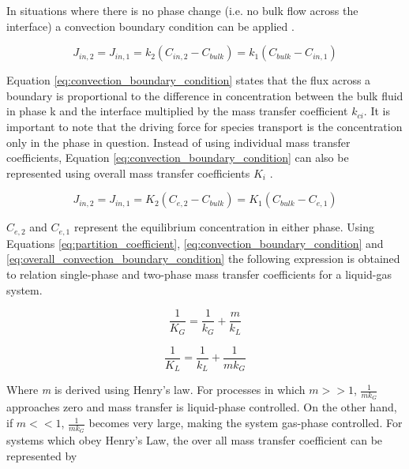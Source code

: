 In situations where there is no phase change (i.e. no bulk flow across the interface) a convection boundary condition can be applied \cite{deen2016}. 

 \begin{equation}
	J_{in,2} =J_{in,1} = k_{2}(C_{in,2} - C_{bulk}) = k_{1}(C_{bulk} - C_{in,1})
	\label{eq:convection_boundary_condition}
\end{equation}

Equation \ref{eq:convection_boundary_condition} states that the flux across a boundary is proportional to the difference in concentration between the bulk fluid in phase k and the interface multiplied by the mass transfer coefficient $k_{ci}$. It is important to note that the driving force for species transport is the concentration only in the phase in question. Instead of using individual mass transfer coefficients, Equation \ref{eq:convection_boundary_condition} can also be represented using overall mass transfer coefficients $K_{i}$ \cite{bird2006}.

 \begin{equation}
	J_{in,2} =J_{in,1} = K_{2}(C_{e,2} - C_{bulk}) = K_{1}(C_{bulk} - C_{e,1})
	\label{eq:overall_convection_boundary_condition}
\end{equation}

$C_{e,2}$ and $C_{e,1}$ represent the equilibrium concentration in either phase. Using Equations \ref{eq:partition_coefficient}, \ref{eq:convection_boundary_condition} and  \ref{eq:overall_convection_boundary_condition} the following expression is obtained to relation single-phase and two-phase mass transfer coefficients for a liquid-gas system.

\begin{equation}
	\frac{1}{K_{G}} = \frac{1}{k_{G}} + \frac{m}{k_{L}}
	\label{eq:gas_phase_resistance}
\end{equation}

\begin{equation}
	\frac{1}{K_{L}} = \frac{1}{k_{L}} + \frac{1}{mk_{G}}
	\label{eq:liq_phase_resistance}
\end{equation}

Where \textit{m} is derived using Henry's law. For processes in which $ m >> 1$, $ \frac{1}{mk_{G}} $ approaches zero and mass transfer is liquid-phase controlled. On the other hand, if $ m << 1$, $ \frac{1}{mk_{G}}$ becomes very large, making the system gas-phase controlled. For systems which obey Henry's Law, the over all mass transfer coefficient can be represented by

